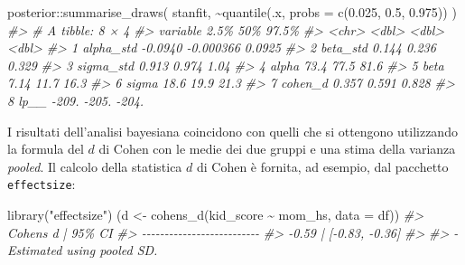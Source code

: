 \documentclass[
  10pt,
  italian,
  a4paper,
  extrafontsizes,onecolumn,openright
  ]{memoir}
\newenvironment{Shaded}{\begin{snugshade}}{\end{snugshade}}
\newcommand{\AttributeTok}[1]{\textcolor[rgb]{0.77,0.63,0.00}{#1}}
\newcommand{\CommentTok}[1]{\textcolor[rgb]{0.56,0.35,0.01}{\textit{#1}}}
\newcommand{\FloatTok}[1]{\textcolor[rgb]{0.00,0.00,0.81}{#1}}
\newcommand{\FunctionTok}[1]{\textcolor[rgb]{0.00,0.00,0.00}{#1}}
\newcommand{\NormalTok}[1]{#1}
\newcommand{\OtherTok}[1]{\textcolor[rgb]{0.56,0.35,0.01}{#1}}
\newcommand{\SpecialCharTok}[1]{\textcolor[rgb]{0.00,0.00,0.00}{#1}}
\newcommand{\StringTok}[1]{\textcolor[rgb]{0.31,0.60,0.02}{#1}}
\begin{document}
\begin{Shaded}
\begin{Highlighting}[]
\NormalTok{posterior}\SpecialCharTok{::}\FunctionTok{summarise\_draws}\NormalTok{(}
\NormalTok{  stanfit, }
  \SpecialCharTok{\textasciitilde{}}\FunctionTok{quantile}\NormalTok{(.x, }\AttributeTok{probs =} \FunctionTok{c}\NormalTok{(}\FloatTok{0.025}\NormalTok{, }\FloatTok{0.5}\NormalTok{, }\FloatTok{0.975}\NormalTok{))}
\NormalTok{)}
\CommentTok{\#\textgreater{} \# A tibble: 8 × 4}
\CommentTok{\#\textgreater{}   variable     \textasciigrave{}2.5\%\textasciigrave{}       \textasciigrave{}50\%\textasciigrave{}   \textasciigrave{}97.5\%\textasciigrave{}}
\CommentTok{\#\textgreater{}   \textless{}chr\textgreater{}         \textless{}dbl\textgreater{}       \textless{}dbl\textgreater{}     \textless{}dbl\textgreater{}}
\CommentTok{\#\textgreater{} 1 alpha\_std   {-}0.0940   {-}0.000366    0.0925}
\CommentTok{\#\textgreater{} 2 beta\_std     0.144     0.236       0.329 }
\CommentTok{\#\textgreater{} 3 sigma\_std    0.913     0.974       1.04  }
\CommentTok{\#\textgreater{} 4 alpha       73.4      77.5        81.6   }
\CommentTok{\#\textgreater{} 5 beta         7.14     11.7        16.3   }
\CommentTok{\#\textgreater{} 6 sigma       18.6      19.9        21.3   }
\CommentTok{\#\textgreater{} 7 cohen\_d      0.357     0.591       0.828 }
\CommentTok{\#\textgreater{} 8 lp\_\_      {-}209.     {-}205.       {-}204.}
\end{Highlighting}
\end{Shaded}

I risultati dell'analisi bayesiana coincidono con quelli che si ottengono utilizzando la formula del \(d\) di Cohen con le medie dei due gruppi e una stima della varianza \emph{pooled}. Il calcolo della statistica \(d\) di Cohen è fornita, ad esempio, dal pacchetto \texttt{effectsize}:

\begin{Shaded}
\begin{Highlighting}[]
\FunctionTok{library}\NormalTok{(}\StringTok{"effectsize"}\NormalTok{)}
\NormalTok{(d }\OtherTok{\textless{}{-}} \FunctionTok{cohens\_d}\NormalTok{(kid\_score }\SpecialCharTok{\textasciitilde{}}\NormalTok{ mom\_hs, }\AttributeTok{data =}\NormalTok{ df))}
\CommentTok{\#\textgreater{} Cohen\textquotesingle{}s d |         95\% CI}
\CommentTok{\#\textgreater{} {-}{-}{-}{-}{-}{-}{-}{-}{-}{-}{-}{-}{-}{-}{-}{-}{-}{-}{-}{-}{-}{-}{-}{-}{-}{-}}
\CommentTok{\#\textgreater{} {-}0.59     | [{-}0.83, {-}0.36]}
\CommentTok{\#\textgreater{} }
\CommentTok{\#\textgreater{} {-} Estimated using pooled SD.}
\end{Highlighting}
\end{Shaded}
\end{document}
